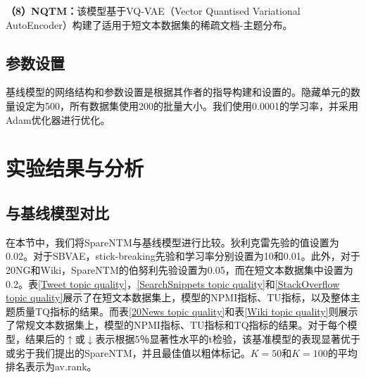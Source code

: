 \textbf{（8）NQTM\cite{NQTM}：}该模型基于VQ-VAE（Vector Quantised Variational AutoEncoder）构建了适用于短文本数据集的稀疏文档-主题分布。

\subsection{参数设置}
基线模型的网络结构和参数设置是根据其作者的指导构建和设置的。隐藏单元的数量设定为500，所有数据集使用200的批量大小。我们使用0.0001的学习率，并采用Adam优化器进行优化。

\section{实验结果与分析}

\subsection{与基线模型对比}
在本节中，我们将SpareNTM与基线模型进行比较。狄利克雷先验的值设置为0.02。对于SBVAE，stick-breaking先验和学习率分别设置为10和0.01。此外，对于20NG和Wiki，SpareNTM的伯努利先验设置为0.05，而在短文本数据集中设置为0.2。表\ref{Tweet topic quality}，\ref{SearchSnippets topic quality}和\ref{StackOverflow topic quality}展示了在短文本数据集上，模型的NPMI指标、TU指标，以及整体主题质量TQ指标的结果。而表\ref{20News topic quality}和表\ref{Wiki topic quality}则展示了常规文本数据集上，模型的NPMI指标、TU指标和TQ指标的结果。对于每个模型，结果后的$\uparrow$或$\downarrow$表示根据5％显著性水平的t检验，该基准模型的表现显著优于或劣于我们提出的SpareNTM，并且最佳值以粗体标记。$K=50$和$K=100$的平均排名表示为av.rank。

